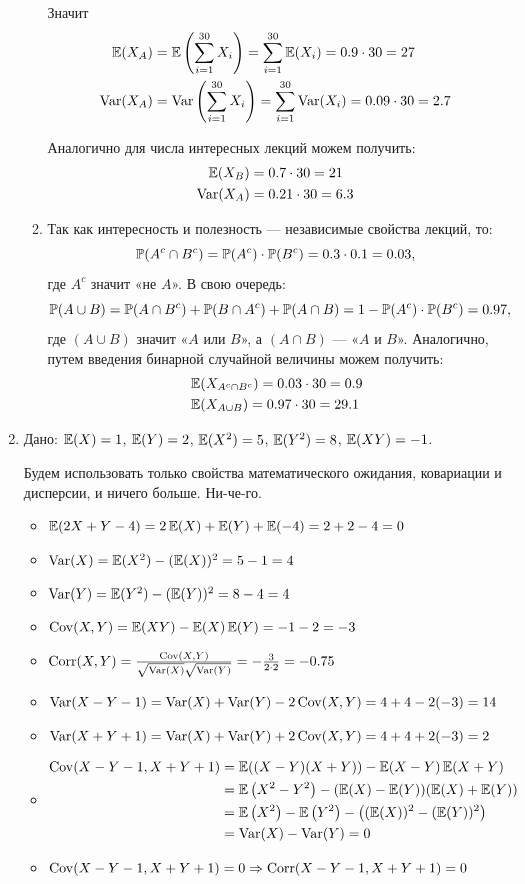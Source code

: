 \begin{enumerate}
\begin{enumerate}
Значит
\begin{align*}
\E(X_A) &= \E\left(\sum\limits_{i=1}^{30}X_i\right) = \sum\limits_{i=1}^{30}\E(X_i)  = 0.9\cdot30 = 27 \\
\Var(X_A) &= \Var\left(\sum\limits_{i=1}^{30}X_i\right) = \sum\limits_{i=1}^{30}\Var(X_i) = 0.09\cdot30 = 2.7
\end{align*}

Аналогично для числа интересных лекций можем получить:
\begin{align*}
\E(X_B) &= 0.7\cdot 30 = 21 \\
\Var(X_A) &= 0.21\cdot 30 = 6.3
\end{align*}


\item Так как интересность и полезность — независимые свойства лекций, то:
\[
\P(A^c \cap B^c) = \P(A^c)\cdot \P(B^c) = 0.3\cdot0.1 = 0.03,
\]
где $A^c$ значит «не $A$».
В свою очередь:
\[
\P(A\cup B) = \P(A\cap B^c) + \P(B\cap A^c) + \P(A\cap B) = 1 - \P(A^c)\cdot \P(B^c) = 0.97,
\]
где $(A\cup B)$ значит «$A$ или $B$», а $(A\cap B)$ — «$A$ и $B$».
Аналогично, путем введения бинарной случайной величины можем получить:
\begin{align*}
& \E(X_{A^c \cap B^c}) = 0.03 \cdot  30 = 0.9 \\
& \E(X_{A\cup B}) = 0.97\cdot30 = 29.1
\end{align*}
\end{enumerate}

\item
Дано: $\E(X) = 1$, $\E(Y) = 2$, $\E(X^2) = 5$, $\E(Y^2) = 8$, $\E(XY) = -1$.

Будем использовать только свойства математического ожидания, ковариации и дисперсии, и ничего больше. Ни-че-го.

\begin{itemize}
\item  $\E(2X + Y - 4) = 2\E(X) + \E(Y) + \E(-4) = 2 + 2 - 4 = 0 $
\item $\Var(X) = \E(X^2) - (\E(X))^2 = 5 - 1 = 4 $
\item $\Var(Y) = \E(Y^2) - (\E(Y))^2 = 8 - 4 = 4 $
\item $\Cov(X, Y) = \E(XY) - \E(X)\E(Y) = -1 - 2 = -3$
\item $\Corr(X, Y) = \frac{\Cov(X, Y)}{\sqrt{\Var(X)}\sqrt{\Var(Y)}} = -\frac{3}{2\cdot 2} = -0.75$
\item $\Var(X-Y-1) = \Var(X) + \Var(Y) - 2\Cov(X, Y) = 4+4 -2(-3) = 14$
\item $\Var(X+Y+1) = \Var(X) + \Var(Y) + 2\Cov(X, Y) = 4+4+2(-3) =2 $
\item \begin{align*}
\Cov(X-Y-1, X+Y+1)&=\E((X-Y)(X+Y))-\E(X-Y)\E(X+Y) \\
&= \E\left(X^2-Y^2\right) - (\E(X)-\E(Y))(\E(X) + \E(Y)) \\
&= \E\left(X^2\right) - \E\left(Y^2\right) - \left((\E(X))^2 -(\E(Y))^2\right)\\
&= \Var(X)-\Var(Y) = 0
\end{align*}
 \item $\Cov(X-Y-1, X+Y+1)=0 \Rightarrow \Corr(X-Y-1, X+Y+1) = 0 $
\end{itemize}


\end{enumerate}
